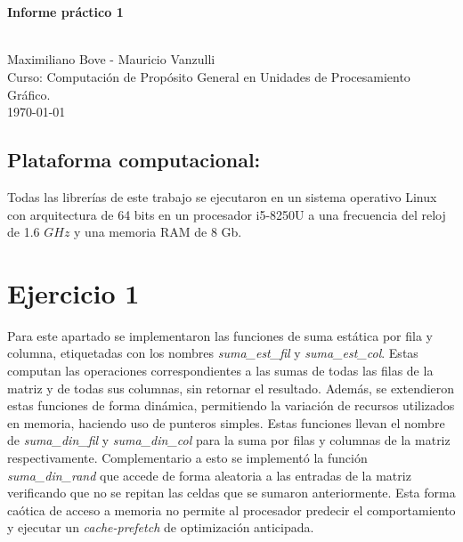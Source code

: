 \documentclass[11pt]{article}
\begin{document}
\begin{center}
\begin{minipage}{0.48\textwidth}
\begin{flushright}
\end{flushright}\end{minipage}
\vspace{4cm}											
\textsc{\huge  \vspace{5px}}\\[1cm]	
\HRule \\[0.4cm]																	%
 \huge \bfseries Informe práctico 1\\[0.4cm]	%
\HRule \\[6.5cm]													\end{center}

\begin{center}	
Maximiliano Bove - Mauricio Vanzulli\\
Curso: Computación de Propósito General en Unidades de Procesamiento Gráfico.\\
{\large \today}																%
\end{center}										  						


%
\newpage
\subsection*{Plataforma computacional:} 
 Todas las librerías de este trabajo se ejecutaron en un sistema operativo Linux con arquitectura de 64 bits en un procesador i5-8250U a una frecuencia del reloj de 1.6 $GHz$  y una memoria RAM de 8 Gb.

\section*{Ejercicio 1}
Para este apartado se implementaron las funciones de suma estática por fila y columna, etiquetadas con los nombres \emph{ suma\_est\_fil} y \emph{ suma\_est\_col}. Estas computan las operaciones correspondientes a las sumas de todas las filas de la matriz y de todas sus columnas, sin retornar el resultado. Además, se extendieron estas funciones de forma dinámica, permitiendo la variación de recursos utilizados en memoria, haciendo uso de punteros simples. Estas funciones llevan el nombre de \emph{ suma\_din\_fil} y \emph{ suma\_din\_col} para la suma por filas y columnas de la matriz respectivamente. Complementario a esto se implementó la función \emph{suma\_din\_rand} que accede de forma aleatoria a las entradas de la matriz verificando que no se repitan las celdas que se sumaron anteriormente. Esta forma caótica de acceso a memoria no permite al procesador predecir el comportamiento y ejecutar un \emph{cache-prefetch} de optimización anticipada. 
\end{document}

